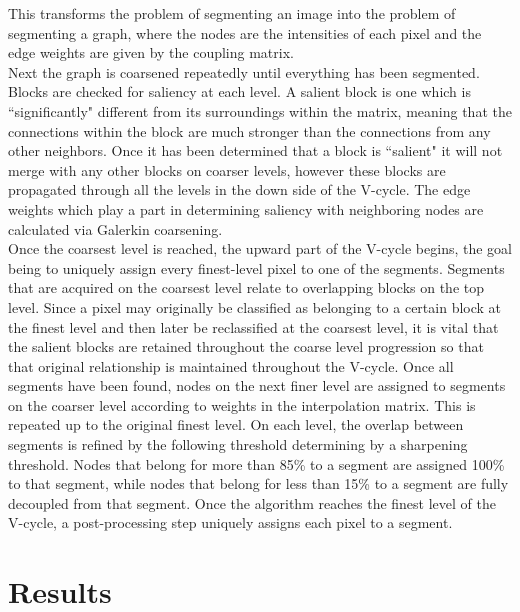 \documentclass[12pt]{article}%
\begin{document}
\noindent This transforms the problem of segmenting an image into the problem of segmenting a graph, where the nodes are the intensities of each pixel and the edge weights are given by the coupling matrix.
\vspace{5mm} \\
Next the graph is coarsened repeatedly until everything has been segmented. Blocks are checked for saliency at each level.  A salient block is one which is ``significantly" different from its surroundings within the matrix, meaning that the connections within the block are much stronger than the connections from any other neighbors. Once it has been determined that a block is ``salient" it will not merge with any other blocks on coarser levels, however these blocks are propagated through all the levels in the down side of the V-cycle.  The edge weights which play a part in determining saliency with neighboring nodes are calculated via Galerkin coarsening.  %
\vspace{5mm} \\
Once the coarsest level is reached, the upward part of the V-cycle begins, the goal being to uniquely assign every finest-level pixel to one of the segments.  Segments that are acquired on the coarsest level relate to overlapping blocks on the top level.  Since a pixel may originally be classified as belonging to a certain block at the finest level and then later be reclassified at the coarsest level, it is vital that the salient blocks are retained throughout the coarse level progression so that that original relationship is maintained throughout the V-cycle. Once all segments have been found, nodes on the next finer level are assigned to segments on the coarser level according to weights in the interpolation matrix. This is repeated up to the original finest level. On each level, the overlap between segments is refined by the following threshold determining by a sharpening threshold.  Nodes that belong for more than 85\% to a segment are assigned 100\% to that segment, while nodes that belong for less than 15\% to a segment are fully decoupled from that segment. Once the algorithm reaches the finest level of the V-cycle, a post-processing step uniquely assigns each pixel to a segment.


\section{Results}
\end{document}
